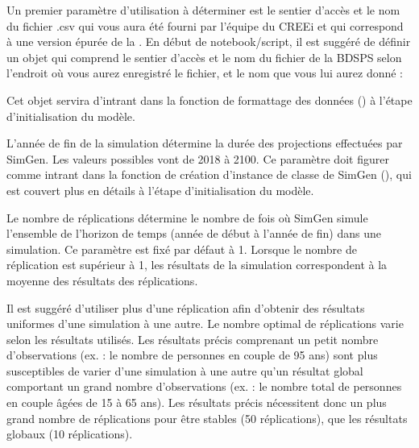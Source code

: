 \documentclass[letterpaper,10pt,french]{sphinxmanual}
\begin{document}

Un premier paramètre d’utilisation à déterminer est le sentier d’accès et le nom du fichier .csv
qui vous aura été fourni par l’équipe du CREEi et qui correspond à une version épurée de
la .
En début de notebook/script, il est suggéré de définir un objet qui comprend le sentier d’accès et le nom du fichier
de la BDSPS selon l’endroit où vous aurez enregistré le fichier, et le nom que vous lui aurez donné :

\begin{sphinxVerbatim}[commandchars=\\\{\}]
  
\end{sphinxVerbatim}

Cet objet servira d’intrant dans la fonction de formattage des données () à l’étape d’initialisation du modèle.


L’année de fin de la simulation détermine la durée des projections effectuées par SimGen. Les valeurs possibles vont de 2018 à 2100.
Ce paramètre doit figurer comme intrant dans la fonction de création d’instance de classe de SimGen (), qui est couvert plus en détails à l’étape d’initialisation du modèle.


Le nombre de réplications détermine le nombre de fois où SimGen simule l’ensemble de l’horizon de temps (année de début à l’année de fin) dans une simulation.
Ce paramètre est fixé par défaut à 1. Lorsque le nombre de réplication est supérieur à 1, les résultats de la simulation correspondent à la moyenne des résultats des réplications.

Il est suggéré d’utiliser plus d’une réplication afin d’obtenir des résultats uniformes d’une simulation à une autre.
Le nombre optimal de réplications varie selon les résultats utilisés. Les résultats précis comprenant un petit nombre d’observations (ex. : le nombre de personnes en couple de 95 ans) sont plus susceptibles de varier
d’une simulation à une autre qu’un résultat global comportant un grand nombre d’observations (ex. : le nombre total de personnes en couple âgées de 15 à 65 ans).
Les résultats précis nécessitent donc un plus grand nombre de réplications pour être stables (50 réplications),
que les résultats globaux (10 réplications).
\end{document}

